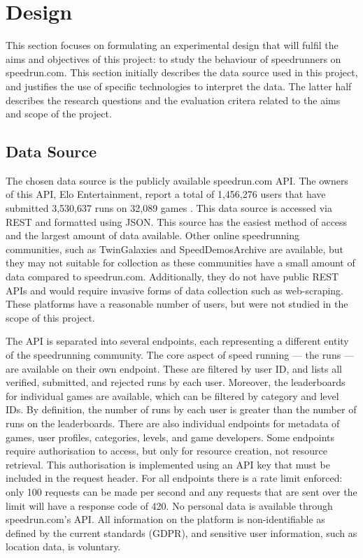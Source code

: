 \section{Design}
\vspace{-5pt}

This section focuses on formulating an experimental design that will fulfil the aims and objectives of this project: to study the behaviour of speedrunners on speedrun.com. This section initially describes the data source used in this project, and justifies the use of specific technologies to interpret the data. The latter half describes the research questions and the evaluation critera related to the aims and scope of the project.

\subsection{Data Source}
\vspace{-5pt}

The chosen data source is the publicly available speedrun.com API. The owners of this API, Elo Entertainment, report a total of 1,456,276 users that have submitted 3,530,637 runs on 32,089 games \cite{speedrun_com}. This data source is accessed via REST and formatted using JSON. This source has the easiest method of access and the largest amount of data available. Other online speedrunning communities, such as TwinGalaxies \cite{twin_galaxies} and SpeedDemosArchive \cite{speed_demos_archive} are available, but they may not suitable for collection as these communities have a small amount of data compared to speedrun.com. Additionally, they do not have public REST APIs and would require invasive forms of data collection such as web-scraping. These platforms have a reasonable number of users, but were not studied in the scope of this project.


The API is separated into several endpoints, each representing a different entity of the speedrunning community. The core aspect of speed running — the runs — are available on their own endpoint. These are filtered by user ID, and lists all verified, submitted, and rejected runs by each user. Moreover, the leaderboards for individual games are available, which can be filtered by category and level IDs. By definition, the number of runs by each user is greater than the number of runs on the leaderboards. There are also individual endpoints for metadata of games, user profiles, categories, levels, and game developers. Some endpoints require authorisation to access, but only for resource creation, not resource retrieval. This authorisation is implemented using an API key that must be included in the request header. For all endpoints there is a rate limit enforced: only 100 requests can be made per second and any requests that are sent over the limit will have a response code of 420. No personal data is available through speedrun.com’s API. All information on the platform is non-identifiable as defined by the current standards (GDPR), and sensitive user information, such as location data, is voluntary.


